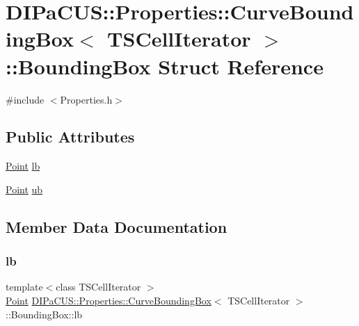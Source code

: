 \hypertarget{structDIPaCUS_1_1Properties_1_1CurveBoundingBox_1_1BoundingBox}{}\section{D\+I\+Pa\+C\+US\+:\+:Properties\+:\+:Curve\+Bounding\+Box$<$ T\+S\+Cell\+Iterator $>$\+:\+:Bounding\+Box Struct Reference}
\label{structDIPaCUS_1_1Properties_1_1CurveBoundingBox_1_1BoundingBox}


{\ttfamily \#include $<$Properties.\+h$>$}

\subsection*{Public Attributes}
\begin{DoxyCompactItemize}
\item 
\mbox{\hyperlink{structDIPaCUS_1_1Properties_1_1CurveBoundingBox_ad97cc519eea736f20195540853c23616}{Point}} \mbox{\hyperlink{structDIPaCUS_1_1Properties_1_1CurveBoundingBox_1_1BoundingBox_af43802e9df071ae721b7f97d7e05a125}{lb}}
\item 
\mbox{\hyperlink{structDIPaCUS_1_1Properties_1_1CurveBoundingBox_ad97cc519eea736f20195540853c23616}{Point}} \mbox{\hyperlink{structDIPaCUS_1_1Properties_1_1CurveBoundingBox_1_1BoundingBox_ab659426563a983cdd681beb88cf82a9a}{ub}}
\end{DoxyCompactItemize}


\subsection{Member Data Documentation}
\mbox{\label{structDIPaCUS_1_1Properties_1_1CurveBoundingBox_1_1BoundingBox_af43802e9df071ae721b7f97d7e05a125}} 
\subsubsection{\texorpdfstring{lb}{lb}}
{\footnotesize\ttfamily template$<$class T\+S\+Cell\+Iterator $>$ \\
\mbox{\hyperlink{structDIPaCUS_1_1Properties_1_1CurveBoundingBox_ad97cc519eea736f20195540853c23616}{Point}} \mbox{\hyperlink{structDIPaCUS_1_1Properties_1_1CurveBoundingBox}{D\+I\+Pa\+C\+U\+S\+::\+Properties\+::\+Curve\+Bounding\+Box}}$<$ T\+S\+Cell\+Iterator $>$\+::Bounding\+Box\+::lb}


